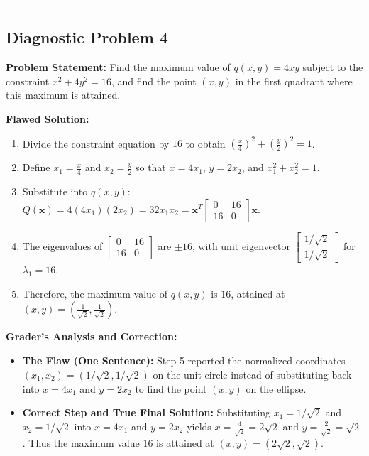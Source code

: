 \documentclass[11pt, letterpaper]{article}
\theoremstyle{definition}
\theoremstyle{remark}
\begin{document}
\medskip
\hrule
\medskip

\subsection*{Diagnostic Problem 4}
\textbf{Problem Statement:} Find the maximum value of $q(x, y) = 4xy$ subject to the constraint $x^2 + 4y^2 = 16$, and find the point $(x, y)$ in the first quadrant where this maximum is attained.

\textbf{Flawed Solution:}
\begin{enumerate}[label=\arabic*.]
    \item Divide the constraint equation by $16$ to obtain $\left(\frac{x}{4}\right)^2 + \left(\frac{y}{2}\right)^2 = 1$.
    \item Define $x_1 = \frac{x}{4}$ and $x_2 = \frac{y}{2}$ so that $x = 4x_1$, $y = 2x_2$, and $x_1^2 + x_2^2 = 1$.
    \item Substitute into $q(x,y)$: $Q(\mathbf{x}) = 4(4x_1)(2x_2) = 32x_1x_2 = \mathbf{x}^T \begin{bmatrix} 0 & 16 \\ 16 & 0 \end{bmatrix} \mathbf{x}$.
    \item The eigenvalues of $\begin{bmatrix} 0 & 16 \\ 16 & 0 \end{bmatrix}$ are $\pm 16$, with unit eigenvector $\begin{bmatrix} 1/\sqrt{2} \\ 1/\sqrt{2} \end{bmatrix}$ for $\lambda_1 = 16$.
    \item Therefore, the maximum value of $q(x,y)$ is $16$, attained at $(x, y) = \left(\frac{1}{\sqrt{2}}, \frac{1}{\sqrt{2}}\right)$.
\end{enumerate}

\textbf{Grader's Analysis and Correction:}
\begin{itemize}
    \item \textbf{The Flaw (One Sentence):} Step 5 reported the normalized coordinates $(x_1, x_2) = (1/\sqrt{2}, 1/\sqrt{2})$ on the unit circle instead of substituting back into $x = 4x_1$ and $y = 2x_2$ to find the point $(x, y)$ on the ellipse.
    \item \textbf{Correct Step and True Final Solution:} Substituting $x_1 = 1/\sqrt{2}$ and $x_2 = 1/\sqrt{2}$ into $x = 4x_1$ and $y = 2x_2$ yields $x = \frac{4}{\sqrt{2}} = 2\sqrt{2}$ and $y = \frac{2}{\sqrt{2}} = \sqrt{2}$. Thus the maximum value $16$ is attained at $(x, y) = (2\sqrt{2}, \sqrt{2})$.
\end{itemize}
\end{document}
